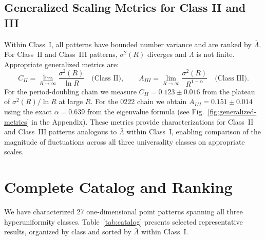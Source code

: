 \documentclass[11pt]{article}
\begin{document}
\subsection{Generalized Scaling Metrics for Class II and III}
\label{sec:generalized-metrics}

Within Class~I, all patterns have bounded number variance and are ranked by $\bar\Lambda$.
For Class~II and Class~III patterns, $\sigma^2(R)$ diverges and $\bar\Lambda$ is not finite.
Appropriate generalized metrics are:
\begin{equation}
  C_{II} = \lim_{R\to\infty} \frac{\sigma^2(R)}{\ln R} \quad \text{(Class II)},
  \qquad
  A_{III} = \lim_{R\to\infty} \frac{\sigma^2(R)}{R^{1-\alpha}} \quad \text{(Class III)}.
  \label{eq:generalized-metrics}
\end{equation}
For the period-doubling chain we measure $C_{II} = 0.123 \pm 0.016$ from the plateau of
$\sigma^2(R)/\ln R$ at large $R$. For the 0222 chain we obtain $A_{III} = 0.151 \pm 0.014$
using the exact $\alpha = 0.639$ from the eigenvalue formula (see Fig.~\ref{fig:generalized-metrics} in the Appendix). These metrics provide characterizations for Class~II and Class~III patterns
analogous to $\bar\Lambda$ within Class~I, enabling comparison of the magnitude
of fluctuations across all three universality classes on appropriate scales.

\section{Complete Catalog and Ranking}
\label{sec:catalog}

We have characterized 27 one-dimensional point patterns spanning all three hyperuniformity
classes. Table~\ref{tab:catalog} presents selected representative results, organized by class and
sorted by $\bar{\Lambda}$ within Class~I.
\end{document}
